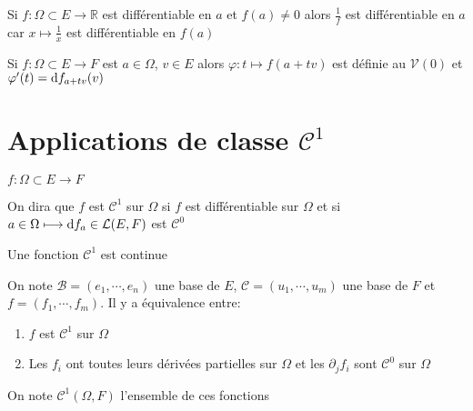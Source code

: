 \begin{rem}
    Si $f:\Omega\subset E\to \mathbb R$ est différentiable en $a$ et $f(a)\neq 0$ alors $\frac 1f$ est différentiable en $a$ car $x\longmapsto \frac 1x$ est différentiable en $f(a)$
\end{rem}

\begin{rem}
    Si $f:\Omega\subset E\to F$ est $a\in\Omega$, $v\in E$ alors $\varphi:t \longmapsto f(a+tv)$ est définie au $\mathcal V(0)$ et $\varphi'(t)=\mathrm{d} f_{a+tv}(v)$
\end{rem}

\needspace{5cm}
\section{Applications de classe \texorpdfstring{$\mathcal C^1$}{C1}}

\begin{thmdef}
    \Hyp $f:\Omega\subset E\longrightarrow F$
    \begin{concenum}
    \item On dira que $f$ est $\mathcal C^1$ sur $\Omega$ si $f$ est différentiable sur $\Omega$ et si $a\in\Omega \longmapsto \mathrm{d} f_a\in\mathcal L(E, F)$ est $\mathcal C^0$
    \item Une fonction $\mathcal C^1$ est continue
    \item On note $\mathcal B=(e_1, \cdots, e_n)$ une base de $E$, $\mathcal C=(u_1, \cdots, u_m)$ une base de $F$ et $f=(f_1, \cdots, f_m)$. Il y a équivalence entre: \begin{enumerate}
        \item $f$ est $\mathcal C^1$ sur $\Omega$
        \item Les $f_i$ ont toutes leurs dérivées partielles sur $\Omega$ et les $\partial_jf_i$ sont $\mathcal C^0$ sur $\Omega$
    \end{enumerate}
\item On note $\mathcal C^1(\Omega, F)$ l'ensemble de ces fonctions
\end{concenum}
\end{thmdef}

